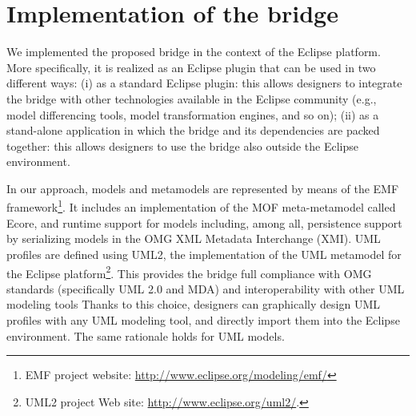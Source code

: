 \section{Implementation of the bridge}\label{sec:tool}
We implemented the proposed bridge in the context of the Eclipse platform.
More specifically, it is realized as an Eclipse plugin that can be used in two different ways: (i) as a standard Eclipse plugin: this allows designers to integrate the bridge with other technologies available in the Eclipse community (e.g., model differencing tools, model transformation engines, and so on); (ii) as a stand-alone application in which the bridge and its dependencies are packed together: this allows designers to use the bridge also outside the Eclipse environment.

In our approach, models and metamodels are represented by means of the EMF
framework\footnote{EMF project website: \small{\url{http://www.eclipse.org/modeling/emf/}}}.
It includes an implementation of the MOF meta-metamodel called Ecore, and runtime support for models including,
among all, persistence support by serializing models in the OMG XML Metadata Interchange (XMI).
UML profiles are defined using UML2,
the implementation of the UML metamodel for the Eclipse
platform\footnote{UML2 project Web site:
\underline{http://www.eclipse.org/uml2/}.}.
This provides the bridge full compliance with OMG standards
(specifically UML 2.0 and MDA) and interoperability with other
UML modeling tools
Thanks to this choice, designers can graphically design UML profiles with any UML modeling tool, and directly import them into
the Eclipse environment. The same rationale holds for UML models.
%


